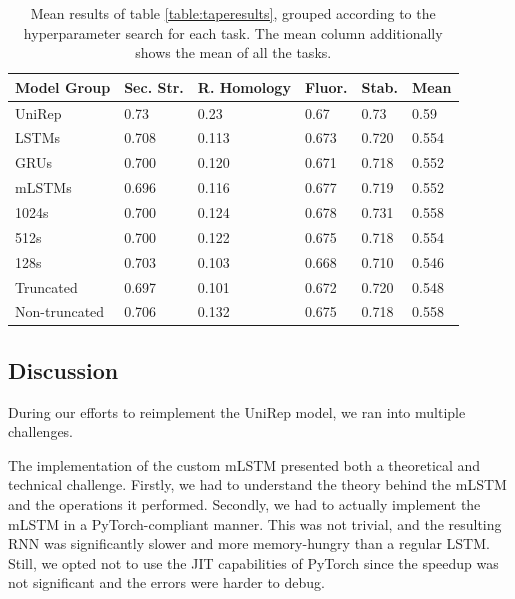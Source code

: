 \documentclass[a4paper,12pt]{article}
\begin{document}
\begin{table}[H]
\centering
{}
\begin{tabularx}{\linewidth}{Llllll}
\toprule
\textbf{Model Group} & \textbf{Sec. Str.} & \textbf{R. Homology} & \textbf{Fluor.} & \textbf{Stab.} & \textbf{Mean} \\ \hline
UniRep               & 0.73               & 0.23                 & 0.67            & 0.73           & 0.59          \\
LSTMs                & 0.708              & 0.113                & 0.673           & 0.720          & 0.554         \\
GRUs                 & 0.700              & 0.120                & 0.671           & 0.718          & 0.552         \\
mLSTMs               & 0.696              & 0.116                & 0.677           & 0.719          & 0.552         \\
1024s                & 0.700              & 0.124                & 0.678           & 0.731          & 0.558         \\
512s                 & 0.700              & 0.122                & 0.675           & 0.718          & 0.554         \\
128s                 & 0.703              & 0.103                & 0.668           & 0.710          & 0.546         \\
Truncated            & 0.697              & 0.101                & 0.672           & 0.720          & 0.548         \\
Non-truncated        & 0.706              & 0.132                & 0.675           & 0.718          & 0.558         \\ \bottomrule
\end{tabularx}
\caption{Mean results of table \ref{table:taperesults}, grouped according to the hyperparameter search for each task. The mean column additionally shows the mean of all the tasks.}
\label{table:taperesults_mean}
\end{table}

\subsection{Discussion}
\label{section:reproduction_challenges}
During our efforts to reimplement the UniRep model, we ran into multiple challenges.

The implementation of the custom mLSTM presented both a theoretical and technical challenge. Firstly, we had to understand the theory behind the mLSTM and the operations it performed. Secondly, we had to actually implement the mLSTM in a PyTorch-compliant manner. This was not trivial, and the resulting RNN was significantly slower and more memory-hungry than a regular LSTM. Still, we opted not to use the JIT capabilities of PyTorch since the speedup was not significant and the errors were harder to debug.
\end{document}
